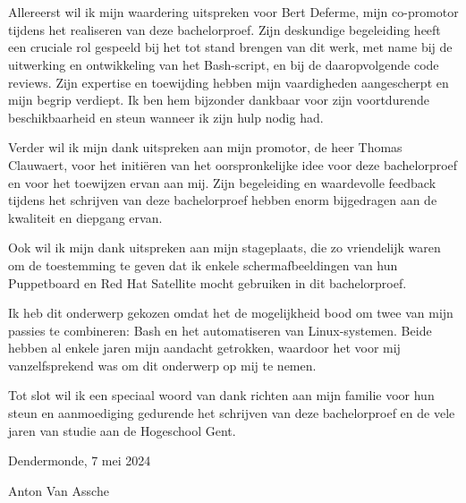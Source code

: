 
\chapter*{}%
\label{ch:voorwoord}

Allereerst wil ik mijn waardering uitspreken voor Bert Deferme, mijn co-promotor tijdens het realiseren van deze bachelorproef.
Zijn deskundige begeleiding heeft een cruciale rol gespeeld bij het tot stand brengen van dit werk, met name bij de uitwerking en ontwikkeling van het Bash-script, en bij de daaropvolgende code reviews.
Zijn expertise en toewijding hebben mijn vaardigheden aangescherpt en mijn begrip verdiept.
Ik ben hem bijzonder dankbaar voor zijn voortdurende beschikbaarheid en steun wanneer ik zijn hulp nodig had.

Verder wil ik mijn dank uitspreken aan mijn promotor, de heer Thomas Clauwaert, voor het initi\"eren van het oorspronkelijke idee voor deze bachelorproef en voor het toewijzen ervan aan mij.
Zijn begeleiding en waardevolle feedback tijdens het schrijven van deze bachelorproef hebben enorm bijgedragen aan de kwaliteit en diepgang ervan.

Ook wil ik mijn dank uitspreken aan mijn stageplaats, die zo vriendelijk waren om de toestemming te geven dat ik enkele schermafbeeldingen van hun Puppetboard en Red Hat Satellite mocht gebruiken in dit bachelorproef.

Ik heb dit onderwerp gekozen omdat het de mogelijkheid bood om twee van mijn passies te combineren: Bash en het automatiseren van Linux-systemen.
Beide hebben al enkele jaren mijn aandacht getrokken, waardoor het voor mij vanzelfsprekend was om dit onderwerp op mij te nemen.

Tot slot wil ik een speciaal woord van dank richten aan mijn familie voor hun steun en aanmoediging gedurende het schrijven van deze bachelorproef en de vele jaren van studie aan de Hogeschool Gent.

Dendermonde, 7 mei 2024

Anton Van Assche
